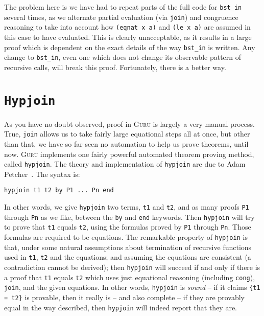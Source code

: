 \documentclass{book}[12pt]
\newcommand{\guru}[0]{\textsc{Guru}\xspace}
\begin{document}
\noindent The problem here is we have had to repeat parts of the full
code for \texttt{bst\_in} several times, as we alternate partial
evaluation (via \texttt{join}) and congruence reasoning to take into
account how \texttt{(eqnat x a)} and \texttt{(le x a)} are assumed in
this case to have evaluated.  This is clearly unacceptable, as it
results in a large proof which is dependent on the exact details of
the way \texttt{bst\_in} is written.  Any change to \texttt{bst\_in},
even one which does not change its observable pattern of recursive
calls, will break this proof.  Fortunately, there is a better way.

\section{\texttt{Hypjoin}}

As you have no doubt observed, proof in \guru is largely a very manual
process.  True, \texttt{join} allows us to take fairly large
equational steps all at once, but other than that, we have so far seen
no automation to help us prove theorems, until now.  \guru implements
one fairly powerful automated theorem proving method, called
\texttt{hypjoin}.  The theory and implementation of \texttt{hypjoin}
are due to Adam Petcher~\cite{petcher08}.  The syntax is:

\begin{verbatim}
hypjoin t1 t2 by P1 ... Pn end
\end{verbatim}

\noindent In other words, we give \texttt{hypjoin} two terms,
\texttt{t1} and \texttt{t2}, and as many proofs \texttt{P1} through
\texttt{Pn} as we like, between the \texttt{by} and \texttt{end}
keywords.  Then \texttt{hypjoin} will try to prove that \texttt{t1}
equals \texttt{t2}, using the formulas proved by \texttt{P1} through
\texttt{Pn}.  Those formulas are required to be equations.  The
remarkable property of \texttt{hypjoin} is that, under some natural
assumptions about termination of recursive functions used in
\texttt{t1}, \texttt{t2} and the equations; and assuming the equations
are consistent (a contradiction cannot be derived); then
\texttt{hypjoin} will succeed if and only if there is a proof that
\texttt{t1} equals \texttt{t2} which uses just equational reasoning
(including \texttt{cong}), \texttt{join}, and the given equations.  In
other words, \texttt{hypjoin} is \emph{sound} -- if it claims
\texttt{\{t1 = t2\}} is provable, then it really is -- and also
complete -- if they are provably equal in the way described, then
\texttt{hypjoin} will indeed report that they are.
\end{document}
